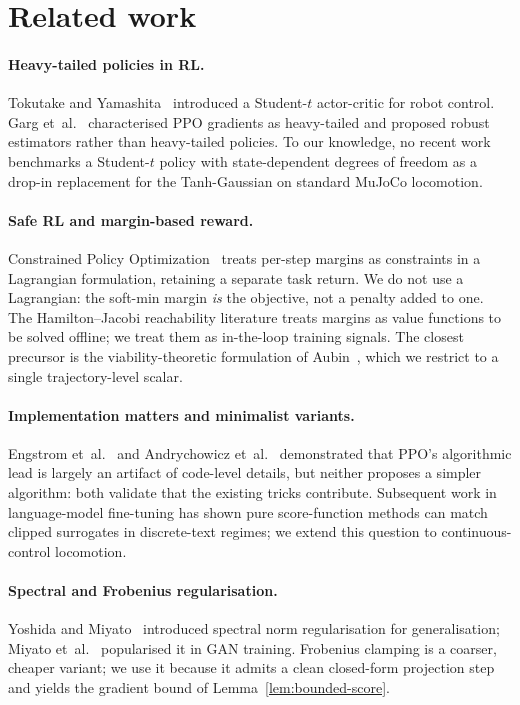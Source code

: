 \section{Related work}
\label{sec:related}

\paragraph{Heavy-tailed policies in RL.}
Tokutake and Yamashita~\cite{tokutake2019} introduced a Student-$t$
actor-critic for robot control. Garg
et~al.~\cite{garg2021heavytails} characterised PPO gradients as
heavy-tailed and proposed robust estimators rather than heavy-tailed
policies. To our knowledge, no recent work benchmarks a Student-$t$
policy with state-dependent degrees of freedom as a drop-in
replacement for the Tanh-Gaussian on standard MuJoCo locomotion.

\paragraph{Safe RL and margin-based reward.}
Constrained Policy Optimization~\cite{achiam2017cpo} treats per-step
margins as constraints in a Lagrangian formulation, retaining a
separate task return. We do not use a Lagrangian: the soft-min
margin \emph{is} the objective, not a penalty added to one. The
Hamilton--Jacobi reachability literature treats margins as value
functions to be solved offline; we treat them as in-the-loop
training signals. The closest precursor is the viability-theoretic
formulation of Aubin~\cite{aubin1991}, which we restrict to a single
trajectory-level scalar.

\paragraph{Implementation matters and minimalist variants.}
Engstrom et~al.~\cite{engstrom2020} and Andrychowicz
et~al.~\cite{andrychowicz2021} demonstrated that PPO's algorithmic
lead is largely an artifact of code-level details, but neither
proposes a simpler algorithm: both validate that the existing tricks
contribute. Subsequent work in language-model fine-tuning has shown
pure score-function methods can match clipped surrogates in
discrete-text regimes; we extend this question to continuous-control
locomotion.

\paragraph{Spectral and Frobenius regularisation.}
Yoshida and Miyato~\cite{yoshida2017spectral} introduced spectral
norm regularisation for generalisation; Miyato
et~al.~\cite{miyato2018spectral} popularised it in GAN training.
Frobenius clamping is a coarser, cheaper variant; we use it because
it admits a clean closed-form projection step and yields the
gradient bound of Lemma~\ref{lem:bounded-score}.

